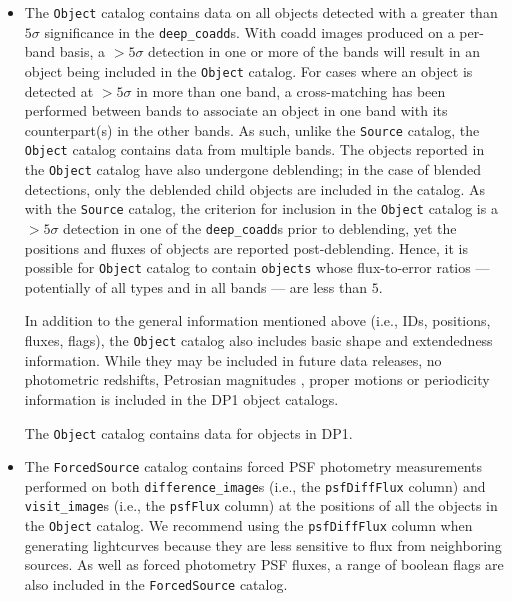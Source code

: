\begin{itemize}
\item The \texttt{Object} catalog contains data on all objects detected with a greater than $5\sigma$ significance in the \texttt{deep\_coadd}s.
With coadd images produced on a per-band basis, a $>5\sigma$ detection in one or more of the bands will result in an object being included in the \texttt{Object} catalog.
For cases where an object is detected at $>5\sigma$ in more than one band, a cross-matching has been performed between bands to associate an object in one band with its counterpart(s) in the other bands.
As such, unlike the \texttt{Source} catalog, the \texttt{Object} catalog contains data from multiple bands. The objects reported in the \texttt{Object} catalog have also undergone deblending; in the case of blended detections, only the deblended child objects are included in the catalog.
As with the \texttt{Source} catalog, the criterion for inclusion in the \texttt{Object} catalog is a $>5\sigma$ detection in one of the \texttt{deep\_coadd}s prior to deblending, yet the positions and fluxes of objects are reported post-deblending. Hence, it is possible for \texttt{Object} catalog to contain \texttt{objects} whose \gls{flux}-to-error ratios --- potentially of all types and in all bands --- are less than $5$.

In addition to the general information mentioned above (i.e., IDs, positions, fluxes, flags), the \texttt{Object} catalog also includes basic \gls{shape} and extendedness information.
While they may be included in future data releases, no photometric redshifts, Petrosian magnitudes \citep{1976ApJ...209L...1P}, proper motions or periodicity information is included in the \gls{DP1} object catalogs.

The \texttt{Object} catalog contains data for \nobjects objects in \gls{DP1}.


\item The \texttt{ForcedSource} catalog contains forced \gls{PSF} photometry measurements performed on both \texttt{difference\_image}s (i.e., the \texttt{psfDiffFlux} column) and \texttt{visit\_image}s (i.e., the \texttt{psfFlux} column) at the positions of all the objects in the \texttt{Object} catalog.
We recommend using the \texttt{psfDiffFlux} column when generating lightcurves because they are less sensitive to \gls{flux} from neighboring sources.
As well as \gls{forced photometry} \gls{PSF} fluxes, a range of boolean flags are also included in the \texttt{ForcedSource} catalog.


\end{itemize}
